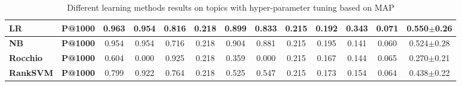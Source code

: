 \documentclass[letterpaper]{article}
\begin{document}
\begin{table}[t]
{{\begin{tabular}{|l|l|c|c|c|c|c|c|c|c|c|c|c|}
\textbf{LR} & \textbf{P@1000} & 0.963 & 0.954 & 0.816 & 0.218 & 0.899 & 0.833 & 0.215 & 0.192 & 0.343 & 0.071 & 0.550$\pm$0.26 \\ \hline
\textbf{NB} & \textbf{P@1000} & 0.954 & 0.954 & 0.716 & 0.218 & 0.904 & 0.881 & 0.215 & 0.195 & 0.141 & 0.060 & 0.524$\pm$0.28 \\ \hline
\textbf{Rocchio} & \textbf{P@1000} & 0.604 & 0.000 & 0.925 & 0.218 & 0.359 & 0.000 & 0.215 & 0.167 & 0.144 & 0.065 & 0.270$\pm$0.21 \\ \hline
\textbf{RankSVM} & \textbf{P@1000} & 0.799 & 0.922 & 0.764 & 0.218 & 0.525 & 0.547 & 0.215 & 0.173 & 0.154 & 0.064 & 0.438$\pm$0.22 \\ \hline
\end{tabular}
}}
\caption{Different learning methods results on topics with hyper-parameter tuning based on MAP}
\label{table:results2}
\end{table}
\end{document}
